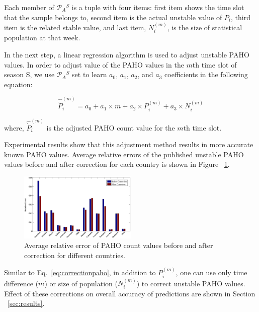 Each member of $\mathcal{P}_A{^S}$ is a tuple with four items: first item shows
the time slot that the sample belongs to, second item is the actual unstable
value of $P_i$, third item is the related stable value, and last item,
$N_i^{(m)}$, is the size of statistical population at that week.

In the next step, a linear regression algorithm is used to adjust unstable PAHO
values. In order to adjust value of the PAHO values in the $m$th time slot of
season S, we use $\mathcal{P}_A{^S}$ set to learn $a_0$, $a_1$, $a_2$, and
$a_3$ coefficients in the following equation:

\begin{equation}
\hat{\dot{P}}_i^{(m)} = a_0 + a_1 \times m + a_2 \times P_i^{(m)} + a_3 \times N_i^{(m)}
\label{eq:correctionpaho}
\end{equation}

where, $\hat{\dot{P}}_i^{(m)}$ is the adjusted PAHO count value for the $m$th time slot.

Experimental results show that this adjustment method results in more accurate
known PAHO values. Average relative errors of the published unstable PAHO
values before and after correction for each
country is shown in Figure ~\ref{fig:avgrelerrors}.


\begin{figure}[h]
  \centering
    \includegraphics[width=0.5\textwidth]{fig/errs.eps}
  \caption{Average relative error of PAHO count values before and after 
  correction for different countries.}
  \label{fig:avgrelerrors}
\end{figure}

Similar to Eq.~\ref{eq:correctionpaho}, in addition to $P_i^{(m)}$, one can
use only time difference ($m$) or size of population ($N_i^{(m)}$) to correct
unstable PAHO values. Effect of these corrections on overall accuracy of
predictions are shown in Section ~\ref{sec:results}.
